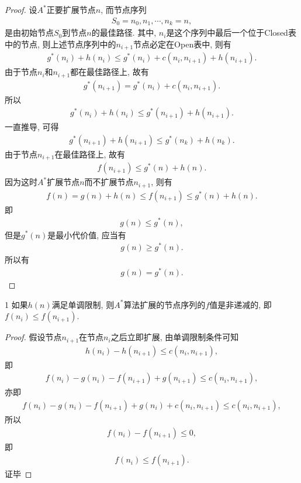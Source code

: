 \begin{proof}
设$A^*$正要扩展节点$n$, 而节点序列
\begin{align}
    S_0=n_0, n_1,\cdots,n_k=n,
\end{align}
是由初始节点$S_0$到节点$n$的最佳路径. 其中, $n_i$是这个序列中最后一个位于Closed表中的节点, 则上述节点序列中的$n_{i+1}$节点必定在Open表中, 则有
\begin{align}
    g^*(n_i)+h(n_i)\leq g^*(n_i) +c(n_i, n_{i+1}) +h(n_{i+1}).
\end{align}
由于节点$n_i$和$n_{i+1}$都在最佳路径上, 故有
\begin{align}
    g^*( n_{i+1} )=g^*(n_i )+c(n_i, n_{i+1}).
\end{align}
所以
\begin{align}
    g^*(n_i )+h(n_i )\leq g^*( n_{i+1}) + h(n_{i+1}).
\end{align}
一直推导, 可得
\begin{align}
    g^*( n_{i+1} )+h(n_{i+1})\leq g^*( n_k) + h(n_k).
\end{align}
由于节点$n_{i+1}$在最佳路径上, 故有
\begin{align}
    f( n_{i+1} )\leq g^*(n) + h(n).
\end{align}
因为这时$A^*$扩展节点$n$而不扩展节点$n_{i+1}$, 则有
\begin{align}
    f(n)=g(n) + h(n)\leq f( n_{i+1} )\leq g^*(n) + h(n).
\end{align}
即
\begin{align}
    g(n)\leq g^*(n),
\end{align}
但是$g^*(n)$是最小代价值, 应当有
\begin{align}
    g(n)\geq g^*(n).
\end{align}
所以有
\begin{align}
    g(n)=g^*(n).
\end{align}
\end{proof}
\begin{mythm}{}{1}
如果$h(n)$满足单调限制, 则$A^*$算法扩展的节点序列的$f$值是非递减的, 即$f(n_i)\leq f(n_{i+1} )$.
\end{mythm}
\begin{proof}
假设节点$n_{i+1}$在节点$n_i$之后立即扩展, 由单调限制条件可知
\begin{align}
    h(n_i)-h(n_{i+1} )\leq c(n_i, n_{i+1}),
\end{align}
即
\begin{align}
    f(n_i)-g(n_i )-f(n_{i+1} )+g(n_{i+1} )\leq c(n_i, n_{i+1} ),
\end{align}
亦即
\begin{align}
    f(n_i)-g(n_i )-f(n_{i+1} )+g(n_i )+c(n_i , n_{i+1} )\leq c(n_i, n_{i+1} ),
\end{align}
所以
\begin{align}
    f(n_i)-f(n_{i+1} )\leq 0,
\end{align}
即
\begin{align}
    f(n_i)\leq f(n_{i+1}).
\end{align}
证毕
\end{proof}
